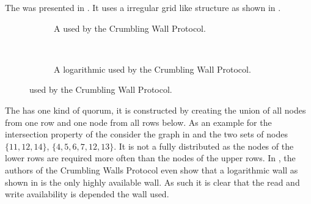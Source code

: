 \documentclass[conference]{IEEEtran}
\begin{document}
The  was presented in \cite{PW94:cw:TR,PW97:acw}.
It uses a irregular grid like structure as shown in .
\begin{figure}
	\begin{subfigure}[t]{0.48\linewidth}
			
		\caption{A  used by the Crumbling Wall Protocol.}
		\label{fig:irregularwall}
	\end{subfigure} ~
	\begin{subfigure}[t]{0.48\linewidth}
			
		\caption{A logarithmic  used by the Crumbling Wall Protocol.}
		\label{fig:logwall}
	\end{subfigure}
	\caption{ used by the Crumbling Wall Protocol.}
	\label{fig:wall}
\end{figure}
The  has one kind of quorum, it is constructed by creating the union of
all nodes from one row and one node from all rows below.
As an example for the intersection property of the  consider the graph
in  and the two sets of nodes \(\{11,12,14\}\),
\(\{4,5,6,7,12,13\}\).
It is not a fully distributed  as the nodes of the lower rows are
required more often than the nodes of the upper rows.
In \cite{PW97:acw}, the authors of the Crumbling Walls Protocol
even show that a logarithmic wall as shown in  is the only
highly available wall.
As such it is clear that the read and write availability is depended the wall
used.
\end{document}
